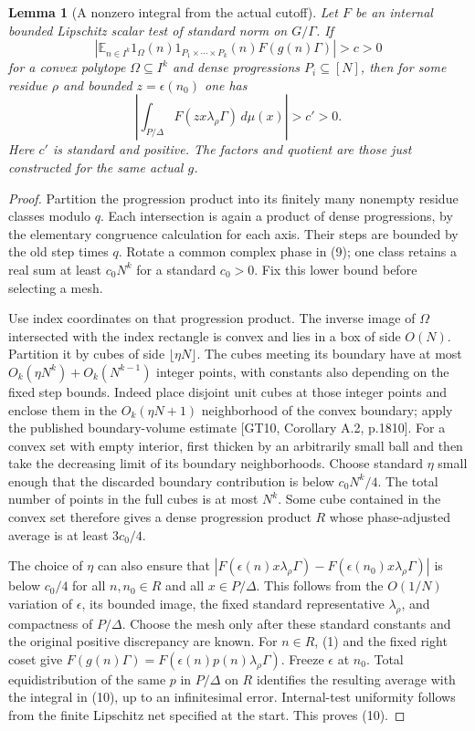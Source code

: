 \documentclass[11pt]{article}
\newtheorem{lemma}[theorem]{Lemma}
\newcommand{\E}{\mathbb E}\newcommand{\poly}{\operatorname{poly}}
\begin{document}
\begin{lemma}[A nonzero integral from the actual cutoff]\label{lem:integral}
Let $F$ be an internal bounded Lipschitz scalar test of standard norm on
$G/\Gamma$. If
\[
 \left|\E_{n\in I^k}1_\Omega(n)1_{P_1\times\cdots\times P_k}(n)
                           F(g(n)\Gamma)\right|>c>0           \tag{9}
\]
for a convex polytope $\Omega\subseteq I^k$ and dense progressions
$P_i\subseteq[N]$, then for some residue $\rho$ and bounded
$z=\epsilon(n_0)$ one has
\[
          \left|\int_{P/\Delta}F(zx\lambda_\rho\Gamma)
                                           \,d\mu(x)\right|>c'>0. \tag{10}
\]
Here $c'$ is standard and positive. The factors and quotient are those
just constructed for the same actual $g$.
\end{lemma}
\begin{proof}
Partition the progression product into its finitely many nonempty residue
classes modulo $q$. Each intersection is again a product of dense
progressions, by the elementary congruence calculation for each axis.
Their steps are bounded by the old step times $q$. Rotate a common complex
phase in (9); one class retains a real sum at least $c_0N^k$ for a
standard $c_0>0$. Fix this lower bound before selecting a mesh.

Use index coordinates on that progression product. The inverse image of
$\Omega$ intersected with the index rectangle is convex and lies in a box
of side $O(N)$. Partition it by cubes of side $\lfloor\eta N\rfloor$.
The cubes meeting its boundary have at most $O_k(\eta N^k)+O_k(N^{k-1})$
integer points, with constants also depending on the fixed step bounds.
Indeed place disjoint unit cubes at those integer points and enclose them
in the $O_k(\eta N+1)$ neighborhood of the convex boundary; apply the
published boundary-volume estimate [GT10, Corollary A.2, p.1810].
For a convex set with empty interior, first thicken by an arbitrarily small
ball and then take the decreasing limit of its boundary neighborhoods.
Choose standard $\eta$ small enough that the discarded boundary
contribution is below $c_0N^k/4$. The total number of points in the full
cubes is at most $N^k$. Some cube contained in the convex set therefore
gives a dense progression product $R$ whose phase-adjusted average is at
least $3c_0/4$.

The choice of $\eta$ can also ensure that
$|F(\epsilon(n)x\lambda_\rho\Gamma)-F(\epsilon(n_0)x\lambda_\rho\Gamma)|$
is below $c_0/4$ for all $n,n_0\in R$ and all
$x\in P/\Delta$. This follows from the $O(1/N)$ variation of $\epsilon$,
its bounded image, the fixed standard representative $\lambda_\rho$, and
compactness of $P/\Delta$. Choose the mesh only after these standard
constants and the original positive discrepancy are known.
For $n\in R$, (1) and the fixed right coset give
$F(g(n)\Gamma)=F(\epsilon(n)p(n)\lambda_\rho\Gamma)$.
Freeze $\epsilon$ at $n_0$. Total equidistribution of the same $p$ in
$P/\Delta$ on $R$ identifies the resulting average with the integral in
(10), up to an infinitesimal error. Internal-test uniformity follows from
the finite Lipschitz net specified at the start. This proves (10).
\end{proof}
\end{document}
